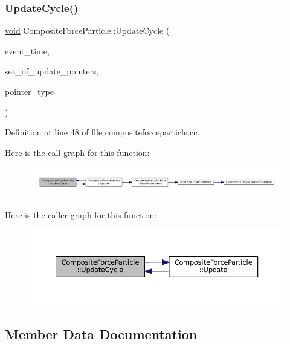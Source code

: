 \subsubsection{\texorpdfstring{Update\+Cycle()}{UpdateCycle()}}
{\footnotesize\ttfamily \mbox{\hyperlink{glad_8h_a950fc91edb4504f62f1c577bf4727c29}{void}} Composite\+Force\+Particle\+::\+Update\+Cycle (\begin{DoxyParamCaption}\item[{std\+::chrono\+::time\+\_\+point$<$ \mbox{\hyperlink{universe_8h_a0ef8d951d1ca5ab3cfaf7ab4c7a6fd80}{Clock}} $>$}]{event\+\_\+time,  }\item[{std\+::vector$<$ \mbox{\hyperlink{class_composite_force_particle}{Composite\+Force\+Particle}} $\ast$$>$}]{set\+\_\+of\+\_\+update\+\_\+pointers,  }\item[{unsigned int}]{pointer\+\_\+type }\end{DoxyParamCaption})}



Definition at line 48 of file compositeforceparticle.\+cc.

Here is the call graph for this function\+:\nopagebreak
\begin{figure}[H]
\begin{center}
\leavevmode
\includegraphics[width=350pt]{class_composite_force_particle_a578d87e48246ef83f39dce070dff541e_cgraph}
\end{center}
\end{figure}
Here is the caller graph for this function\+:\nopagebreak
\begin{figure}[H]
\begin{center}
\leavevmode
\includegraphics[width=350pt]{class_composite_force_particle_a578d87e48246ef83f39dce070dff541e_icgraph}
\end{center}
\end{figure}


\subsection{Member Data Documentation}
\mbox{\label{class_composite_force_particle_a00d5ce181c8d4b1df0d46ff23a8fb1b8}} 
